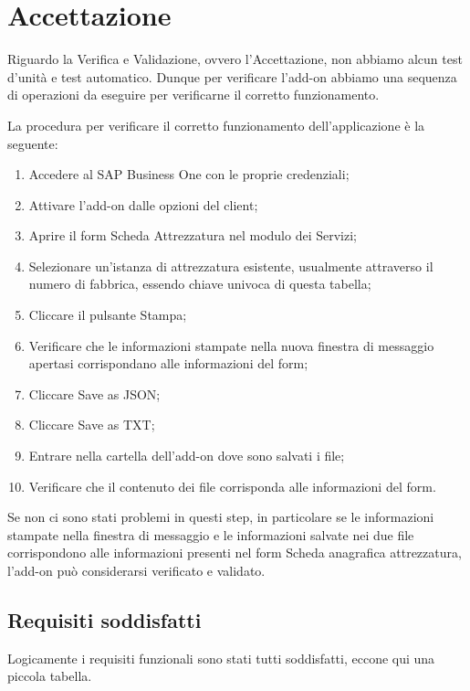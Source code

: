 \newpage

\section{Accettazione}
\begin{flushleft}

Riguardo la Verifica e Validazione, ovvero l'Accettazione, non abbiamo alcun test d'unità e test automatico.
Dunque per verificare l'add-on abbiamo una sequenza di operazioni da eseguire per verificarne il corretto funzionamento.
\vspace{1em}


La procedura per verificare il corretto funzionamento dell'applicazione è la seguente:

\end{flushleft}

\begin{enumerate}
	\item Accedere al SAP Business One con le proprie credenziali;
	\item Attivare l'add-on dalle opzioni del client;
	\item Aprire il form Scheda Attrezzatura nel modulo dei Servizi;
	\item Selezionare un'istanza di attrezzatura esistente, usualmente attraverso il numero di fabbrica, essendo chiave univoca di questa tabella;
	\item Cliccare il pulsante Stampa;
	\item Verificare che le informazioni stampate nella nuova finestra di messaggio apertasi corrispondano alle informazioni del form;
	\item Cliccare Save as JSON;
	\item Cliccare Save as TXT;
	\item Entrare nella cartella dell'add-on dove sono salvati i file;
	\item Verificare che il contenuto dei file corrisponda alle informazioni del form.
\end{enumerate}

Se non ci sono stati problemi in questi step, in particolare se le informazioni stampate nella finestra di messaggio e le informazioni salvate nei due file corrispondono alle informazioni presenti nel form Scheda anagrafica attrezzatura, l'add-on può considerarsi verificato e validato.

\subsection{Requisiti soddisfatti}
Logicamente i requisiti funzionali sono stati tutti soddisfatti, eccone qui una piccola tabella.

